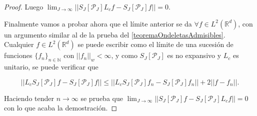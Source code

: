 \begin{proof}
\noindent Luego $\lim_{J\rightarrow\infty}||S_J[\mathcal{P}_J] L_cf - S_J[\mathcal{P}_J]f ||=0$.

\medskip

\noindent Finalmente vamos a probar ahora que el límite anterior se da $\forall f \in L^2(\mathbb{R}^d)$, con un argumento similar al de la prueba del \autoref{teoremaOndeletasAdmisibles}. Cualquier $f\in L^2(\mathbb{R}^d)$ se puede escribir como el límite de una sucesión de funciones $\lbrace f_n \rbrace_{n\in\mathbb{N}}$ con $||f_n||_w < \infty$, y como $S_J[\mathcal{P}_J]$ es no expansivo y $L_c$ es unitario, se puede verificar que 

$$||L_c S_J[\mathcal{P}_J]f-S_J[\mathcal{P}_J]f|| \leq ||L_c S_J [\mathcal{P}_J]f_n -S_J[\mathcal{P}_J]f_n|| + 2||f-f_n||.$$

\noindent Haciendo tender $n \rightarrow \infty$ se prueba que $\lim_{J\rightarrow \infty}||S_J[\mathcal{P}_J] f-S_J[\mathcal{P}_J] L_cf||=0$ con lo que acaba la demostración. \qedhere
\end{proof}



































